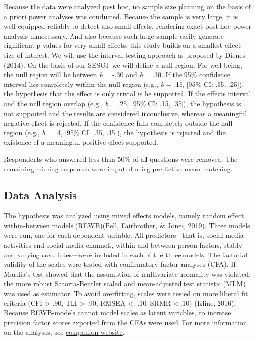 \documentclass[
  english,
  man,floatsintext]{apa6}
\begin{document}
Because the data were analyzed post hoc, no sample size planning on the basis of a priori power analyses was conducted.
Because the sample is very large, it is well-equipped reliably to detect also small effects, rendering exact post hoc power analysis unnecessary.
And also because such large sample easily generate significant p-values for very small effects, this study builds on a smallest effect size of interest.
We will use the interval testing approach as proposed by Dienes (2014).
On the basis of our SESOI, we will define a null region.
For well-being, the null region will be between \emph{b} = -.30 and \emph{b} = .30.
If the 95\% confidence interval lies completely within the null-region (e.g., \emph{b} = .15, {[}95\% CI: .05, .25{]}), the hypothesis that the effect is only trivial is be supported.
If the effects interval and the null region overlap (e.g., \emph{b} = .25, {[}95\% CI: .15, .35{]}), the hypothesis is not supported and the results are considered inconclusive, whereas a meaningful negative effect is rejected.
If the confidence falls completely outside the null-region (e.g., \emph{b} = .4, {[}95\% CI: .35, .45{]}), the hypothesis is rejected and the existence of a meaningful positive effect supported.

Respondents who answered less than 50\% of all questions were removed.
The remaining missing responses were imputed using predictive mean matching.

\hypertarget{data-analysis}{%
\subsection{Data Analysis}\label{data-analysis}}

The hypothesis was analyzed using mixed effects models, namely random effect within-between models (REWB)(Bell, Fairbrother, \& Jones, 2019).
Three models were run, one for each dependent variable.
All predictors---that is, social media activities and social media channels, within and between-person factors, stably and varying covariates---were included in each of the three models.
The factorial validity of the scales were tested with confirmatory factor analyses (CFA).
If Mardia's test showed that the assumption of multivariate normality was violated, the more robust Satorra-Bentler scaled and mean-adjusted test statistic (MLM) was used as estimator.
To avoid overfitting, scales were tested on more liberal fit criteria (CFI \textgreater{} .90, TLI \textgreater{} .90, RMSEA \textless. .10, SRMR \textless{} .10) (Kline, 2016).
Because REWB-models cannot model scales as latent variables, to increase precision factor scores exported from the CFAs were used.
For more information on the analyses, see \href{xxx}{companion website}.
\end{document}
